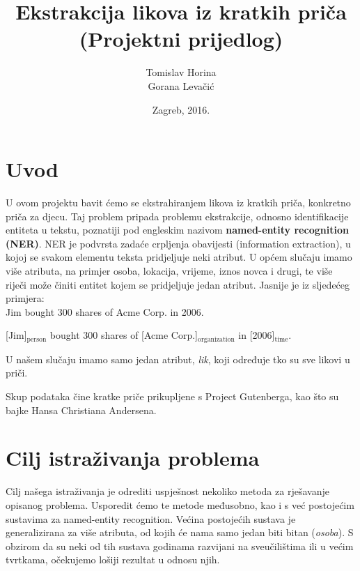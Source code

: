 \documentclass[]{article}
\title{Ekstrakcija likova iz kratkih priča \\ (Projektni prijedlog)}
\author{Tomislav Horina \\ Gorana Levačić}
\date{Zagreb, 2016.}
\begin{document}
	
	\maketitle
	\thispagestyle{empty}
	
	\newpage
	
	\tableofcontents
	
	\newpage
	
	\section{Uvod}
	U ovom projektu bavit ćemo se ekstrahiranjem likova iz kratkih priča, konkretno priča za djecu. Taj problem pripada problemu ekstrakcije, odnosno identifikacije entiteta u tekstu, poznatiji pod engleskim nazivom \textbf{named-entity recognition (NER)}. NER je podvrsta zadaće crpljenja obavijesti (information extraction), u kojoj se svakom elementu teksta pridjeljuje neki atribut. U općem slučaju imamo više atributa, na primjer osoba, lokacija, vrijeme, iznos novca i drugi, te više riječi može činiti entitet kojem se pridjeljuje jedan atribut. Jasnije je iz sljedećeg primjera: \\
	
	\hspace{1em}Jim bought 300 shares of Acme Corp. in 2006.
	
	\hspace{1em}[Jim]$_{\mbox{person}}$ bought 300 shares of [Acme Corp.]$_{\mbox{organization}}$ in [2006]$_{\mbox{time}}$.
	
	\vspace{1em}
	
	U našem slučaju imamo samo jedan atribut, \textit{lik}, koji određuje tko su sve likovi u priči.
	
	Skup podataka čine kratke priče prikupljene s Project Gutenberga, kao što su bajke Hansa Christiana Andersena.
	
	\section{Cilj istraživanja problema}
	
	Cilj našega istraživanja je odrediti uspješnost nekoliko metoda za rješavanje opisanog problema. Usporedit ćemo te metode međusobno, kao i s već postojećim sustavima za named-entity recognition. Većina postojećih sustava je generalizirana za više atributa, od kojih će nama samo jedan biti bitan (\textit{osoba}). S obzirom da su neki od tih sustava godinama razvijani na sveučilištima ili u većim tvrtkama, očekujemo lošiji rezultat u odnosu njih.
	
\end{document}
